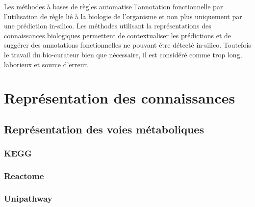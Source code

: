 Les méthodes à bases de règles automatise l'annotation fonctionnelle par l'utilisation de règle lié à la biologie de l'organisme et non plus uniquement par une prédiction in-silico.  Les méthodes utilisant la représentations des connaissances biologiques permettent de contextualiser les prédictions et de suggérer des annotations fonctionnelles ne pouvant être détecté in-silico. Toutefois le travail du bio-curateur bien que nécessaire, il est considéré comme trop long, laborieux et source d'erreur.






\section{Représentation des connaissances}
\subsection{Représentation des voies métaboliques}
\subsubsection{KEGG}
\subsubsection{Reactome}
\subsubsection{Unipathway}
